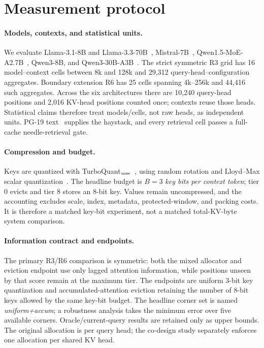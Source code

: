\documentclass{article}
\theoremstyle{definition}
\begin{document}
\section{Measurement protocol}
\label{sec:protocol}

\paragraph{Models, contexts, and statistical units.}
We evaluate Llama-3.1-8B and Llama-3.3-70B~\citep{grattafiori2024llama3}, Mistral-7B~\citep{jiang2023mistral}, Qwen1.5-MoE-A2.7B~\citep{qwen2024moe}, Qwen3-8B, and Qwen3-30B-A3B~\citep{yang2025qwen3}.  The strict symmetric R3 grid has 16 model--context cells between 8k and 128k and 29,312 query-head--configuration aggregates.  Boundary extension R6 has 25 cells spanning 4k--256k and 44,416 such aggregates.  Across the six architectures there are 10,240 query-head positions and 2,016 KV-head positions counted once; contexts reuse those heads.  Statistical claims therefore treat models/cells, not raw heads, as independent units.  PG-19 text~\citep{rae2020pg19} supplies the haystack, and every retrieval cell passes a full-cache needle-retrieval gate.

\paragraph{Compression and budget.}
Keys are quantized with TurboQuant$_{\rm mse}$~\citep{zandieh2025turboquant}, using random rotation and Lloyd--Max scalar quantization~\citep{lloyd1982least}.  The headline budget is $B=3$ \emph{key bits per context token}; tier 0 evicts and tier 8 stores an 8-bit key.  Values remain uncompressed, and the accounting excludes scale, index, metadata, protected-window, and packing costs.  It is therefore a matched key-bit experiment, not a matched total-KV-byte system comparison.

\paragraph{Information contract and endpoints.}
The primary R3/R6 comparison is symmetric: both the mixed allocator and eviction endpoint use only lagged attention information, while positions unseen by that score remain at the maximum tier.  The endpoints are uniform 3-bit key quantization and accumulated-attention eviction retaining the number of 8-bit keys allowed by the same key-bit budget.  The headline corner set is named \emph{uniform+accum}; a robustness analysis takes the minimum error over five available corners.  Oracle/current-query results are retained only as upper bounds.  The original allocation is per query head; the co-design study separately enforces one allocation per shared KV head.
\end{document}
